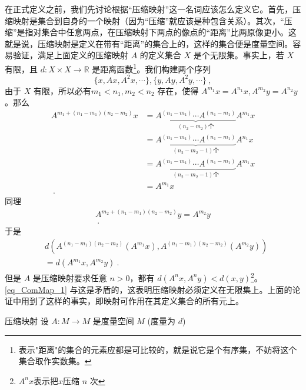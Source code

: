 在正式定义之前，我们先讨论根据“压缩映射”这一名词应该怎么定义它。首先，压缩映射是集合到自身的一个映射（因为“压缩”就应该是种包含关系）。其次，“压缩”是指对集合中任意两点，在压缩映射下两点的像点的“距离”比两原像更小。这就是说，压缩映射是定义在带有“距离”的集合上的，这样的集合便是度量空间。容易验证，满足上面定义的压缩映射 $A$ 的定义集合 $X$ 是个无限集。事实上，若 $X$ 有限，且 $d:X\times X\rightarrow \mathbb R$ 是距离函数\footnote{表示"距离"的集合的元素应都是可比较的，就是说它是个有序集，不妨将这个集合取作实数集。}。我们构建两个序列
\begin{equation}
\{x,Ax,A^2x,\cdots\},\{y,Ay,A^2y,\cdots\}~,
\end{equation}
由于 $X$ 有限，所以必有$m_1<n_1,m_2<n_2$ 存在，使得 $A^{m_1}x=A^{n_1}x,A^{m_2}y=A^{n_2}y$ 。那么
\begin{equation}
\begin{aligned}
A^{m_1+(n_1-m_1)(n_2-m_2)}x&=\underbrace{A^{(n_1-m_1)}\cdots A^{(n_1-m_1)}}_{(n_2-m_2)\text{个}}A^{m_1}x\\
&=\underbrace{A^{(n_1-m_1)}\cdots A^{(n_1-m_1)}}_{(n_2-m_2-1)\text{个}}A^{n_1}x\\
&=\underbrace{A^{(n_1-m_1)}\cdots A^{(n_1-m_1)}}_{(n_2-m_2-1)\text{个}}A^{m_1}x\\
&=A^{m_1}x\\~.
\end{aligned}
\end{equation}
同理
\begin{equation}
\begin{aligned}
A^{m_2+(n_1-m_1)(n_2-m_2)}y=A^{m_2}y\\~.
\end{aligned}
\end{equation}
于是
\begin{equation}\label{eq_ComMap_1}
\begin{aligned}
&d(A^{(n_1-m_1)(n_2-m_2)}(A^{m_1}x),A^{(n_1-m_1)(n_2-m_2)}(A^{m_2}y))\\
&=d(A^{m_1}x,A^{m_2}y)~.
\end{aligned}
\end{equation}
但是 $A$ 是压缩映射要求任意 $n>0$，都有 $d(A^n x,A^n y)<d(x,y)$\footnote{$A^n x$表示把$x$压缩 $n$ 次}。\autoref{eq_ComMap_1} 与这是矛盾的，这表明压缩映射必须定义在无限集上。上面的论证中用到了这样的事实，即映射可作用在其定义集合的所有元上。


\begin{definition}{压缩映射}
设 $A:M\rightarrow M$ 是度量空间 $M$ (度量为 $d$)
\end{definition}